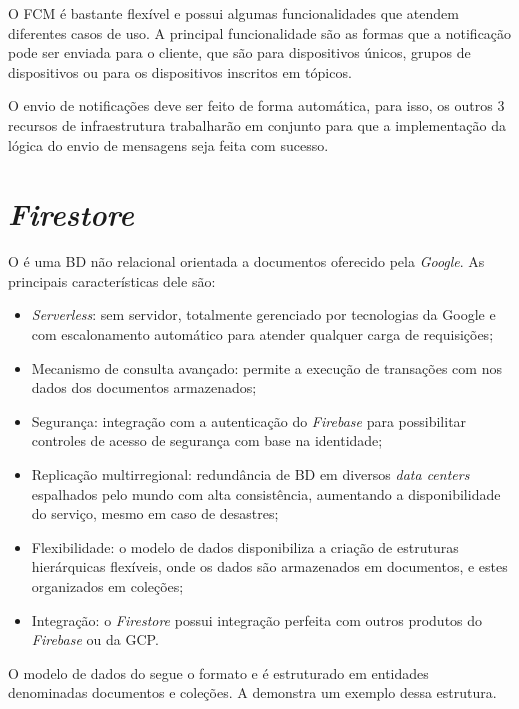 O FCM é bastante flexível e possui algumas funcionalidades que atendem diferentes casos de uso. A principal funcionalidade são as formas que a notificação pode ser enviada para o cliente, que são para dispositivos únicos, grupos de dispositivos ou para os dispositivos inscritos em tópicos. 

O envio de notificações deve ser feito de forma automática, para isso, os outros 3 recursos de infraestrutura trabalharão em conjunto para que a implementação da lógica do envio de mensagens seja feita com sucesso.

\section{\textit{Firestore}}\label{sec:firestore}

O \textcite{FirestoreDocs} é uma BD não relacional orientada a documentos oferecido pela \textit{Google}. As principais características dele são:

\begin{itemize}
    \item \textit{Serverless}: sem servidor, totalmente gerenciado por tecnologias da Google e com escalonamento automático para atender qualquer carga de requisições;
    \item Mecanismo de consulta avançado: permite a execução de transações com  nos dados dos documentos armazenados;
    \item Segurança: integração com a autenticação do \textit{Firebase} para possibilitar controles de acesso de segurança com base na identidade;
    \item Replicação multirregional: redundância de BD em diversos \textit{data centers} espalhados pelo mundo com alta consistência, aumentando a disponibilidade do serviço, mesmo em caso de desastres;
    \item Flexibilidade: o modelo de dados disponibiliza a criação de estruturas hierárquicas flexíveis, onde os dados são armazenados em documentos, e estes organizados em coleções;
    \item Integração: o \textit{Firestore} possui integração perfeita com outros produtos do \textit{Firebase} ou da GCP.
\end{itemize}

O modelo de dados do \textcite{FirestoreDataModel} segue o formato  e é estruturado em entidades denominadas documentos e coleções. A  demonstra um exemplo dessa estrutura.

